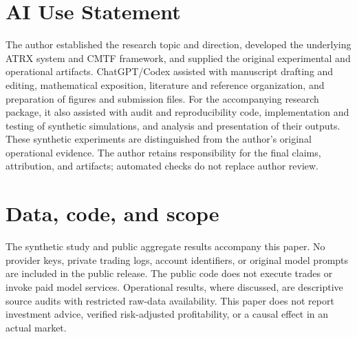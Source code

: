 \section*{AI Use Statement}
The author established the research topic and direction, developed the underlying ATRX system and CMTF framework, and supplied the original experimental and operational artifacts. ChatGPT/Codex assisted with manuscript drafting and editing, mathematical exposition, literature and reference organization, and preparation of figures and submission files. For the accompanying research package, it also assisted with audit and reproducibility code, implementation and testing of synthetic simulations, and analysis and presentation of their outputs. These synthetic experiments are distinguished from the author's original operational evidence. The author retains responsibility for the final claims, attribution, and artifacts; automated checks do not replace author review.

\section*{Data, code, and scope}
The synthetic study and public aggregate results accompany this paper. No provider keys, private trading logs, account identifiers, or original model prompts are included in the public release. The public code does not execute trades or invoke paid model services. Operational results, where discussed, are descriptive source audits with restricted raw-data availability. This paper does not report investment advice, verified risk-adjusted profitability, or a causal effect in an actual market.
